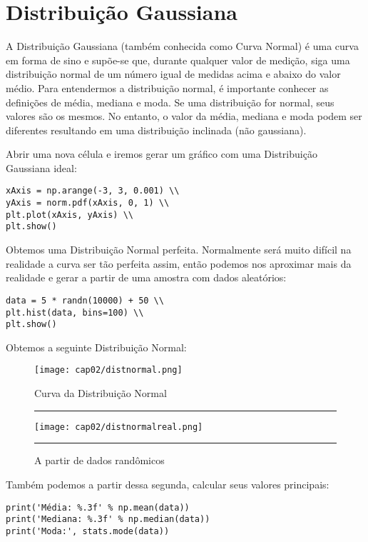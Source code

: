 \section{Distribuição Gaussiana}
A Distribuição Gaussiana (também conhecida como Curva Normal) é uma curva em forma de sino e supõe-se que, durante qualquer valor de medição, siga uma distribuição normal de um número igual de medidas acima e abaixo do valor médio. Para entendermos a distribuição normal, é importante conhecer as definições de média, mediana e moda. Se uma distribuição for normal, seus valores são os mesmos. No entanto, o valor da média, mediana e moda podem ser diferentes resultando em uma distribuição inclinada (não gaussiana).

Abrir uma nova célula e iremos gerar um gráfico com uma Distribuição Gaussiana ideal:
\begin{lstlisting}[]
xAxis = np.arange(-3, 3, 0.001) \\
yAxis = norm.pdf(xAxis, 0, 1) \\
plt.plot(xAxis, yAxis) \\
plt.show()
\end{lstlisting}

Obtemos uma Distribuição Normal perfeita. Normalmente será muito difícil na realidade a curva ser tão perfeita assim, então podemos nos aproximar mais da realidade e gerar a partir de uma amostra com dados aleatórios:
\begin{lstlisting}[]
data = 5 * randn(10000) + 50 \\
plt.hist(data, bins=100) \\
plt.show()
\end{lstlisting}

Obtemos a seguinte Distribuição Normal:
\begin{figure}[H]
	\centering
	\begin{minipage}[t]{0.4\linewidth}
		\texttt{[image: cap02/distnormal.png]}
		\caption{Curva da Distribuição Normal}
		\label{fig:first}
	\end{minipage}\rule{3em}{0pt}%
	\begin{minipage}[t]{0.4\linewidth}
		\texttt{[image: cap02/distnormalreal.png]}
		\caption{A partir de dados randômicos}
		\label{fig:first}
	\end{minipage}\rule{3em}{0pt}%
\end{figure}

Também podemos a partir dessa segunda, calcular seus valores principais:
\begin{lstlisting}[]
print('Média: %.3f' % np.mean(data))
print('Mediana: %.3f' % np.median(data))
print('Moda:', stats.mode(data))
\end{lstlisting} \vspace{-1em}

